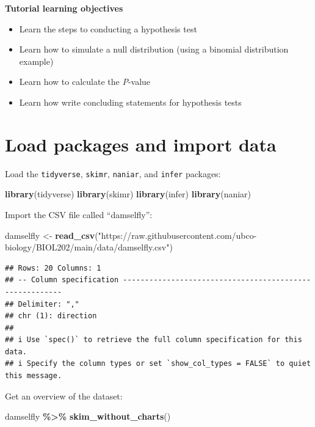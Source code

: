 \documentclass[
]{book}
\newenvironment{Shaded}{\begin{snugshade}}{\end{snugshade}}
\newcommand{\FunctionTok}[1]{\textcolor[rgb]{0.13,0.29,0.53}{\textbf{#1}}}
\newcommand{\NormalTok}[1]{#1}
\newcommand{\OtherTok}[1]{\textcolor[rgb]{0.56,0.35,0.01}{#1}}
\newcommand{\SpecialCharTok}[1]{\textcolor[rgb]{0.81,0.36,0.00}{\textbf{#1}}}
\newcommand{\StringTok}[1]{\textcolor[rgb]{0.31,0.60,0.02}{#1}}
\providecommand{\tightlist}{%
  \setlength{\itemsep}{0pt}\setlength{\parskip}{0pt}}
\begin{document}
\textbf{Tutorial learning objectives}

\begin{itemize}
\tightlist
\item
  Learn the steps to conducting a hypothesis test
\item
  Learn how to simulate a null distribution (using a binomial distribution example)
\item
  Learn how to calculate the \emph{P}-value
\item
  Learn how write concluding statements for hypothesis tests
\end{itemize}

\section{Load packages and import data}\label{hyp_packages_data}

Load the \texttt{tidyverse}, \texttt{skimr}, \texttt{naniar}, and \texttt{infer} packages:

\begin{Shaded}
\begin{Highlighting}[]
\FunctionTok{library}\NormalTok{(tidyverse)}
\FunctionTok{library}\NormalTok{(skimr)}
\FunctionTok{library}\NormalTok{(infer)}
\FunctionTok{library}\NormalTok{(naniar)}
\end{Highlighting}
\end{Shaded}

Import the CSV file called ``damselfly'':

\begin{Shaded}
\begin{Highlighting}[]
\NormalTok{damselfly }\OtherTok{\textless{}{-}} \FunctionTok{read\_csv}\NormalTok{(}\StringTok{"https://raw.githubusercontent.com/ubco{-}biology/BIOL202/main/data/damselfly.csv"}\NormalTok{)}
\end{Highlighting}
\end{Shaded}

\begin{verbatim}
## Rows: 20 Columns: 1
## -- Column specification --------------------------------------------------------
## Delimiter: ","
## chr (1): direction
## 
## i Use `spec()` to retrieve the full column specification for this data.
## i Specify the column types or set `show_col_types = FALSE` to quiet this message.
\end{verbatim}

Get an overview of the dataset:

\begin{Shaded}
\begin{Highlighting}[]
\NormalTok{damselfly }\SpecialCharTok{\%\textgreater{}\%}
  \FunctionTok{skim\_without\_charts}\NormalTok{()}
\end{Highlighting}
\end{Shaded}
\end{document}
